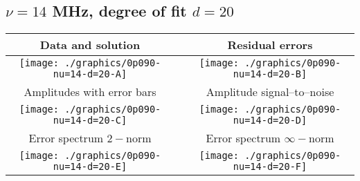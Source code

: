 

% 

\clearpage{}
\break{}

\subsection{$\nu = 14$ MHz, degree of fit $d = 20$}

\begin{table}[h]
    \begin{center}
        \begin{tabular}{ccc}
            Data and solution & \quad & Residual errors \\\hline
            \texttt{[image: ./graphics/0p090-nu=14-d=20-A]} &&
            \texttt{[image: ./graphics/0p090-nu=14-d=20-B]} \\[15pt]
            Amplitudes with error bars && Amplitude signal--to--noise \\\hline
            \texttt{[image: ./graphics/0p090-nu=14-d=20-C]} &&
            \texttt{[image: ./graphics/0p090-nu=14-d=20-D]} \\[15pt]
            Error spectrum $2-$norm && Error spectrum $\infty-$norm \\\hline
            \texttt{[image: ./graphics/0p090-nu=14-d=20-E]} &&
            \texttt{[image: ./graphics/0p090-nu=14-d=20-F]} \\[15pt]
        \end{tabular}
    \end{center}
\label{fig:elev=90, nu=14}
\end{table}



\endinput

